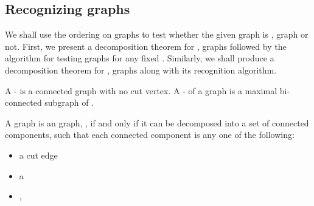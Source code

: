 \documentclass[runningheads]{llncs}
\begin{document}
\subsection{Recognizing  graphs}
We shall use the ordering on  graphs to test whether the given graph is , graph or not. First, we present a decomposition theorem for , graphs followed by the algorithm for testing  graphs for any fixed . Similarly, we shall produce a decomposition theorem for , graphs along with its recognition algorithm.

\begin{definition}
A -  is a connected graph with no cut vertex. A -  of a graph  is a maximal bi-connected subgraph of . 
\end{definition}


\begin{theorem}
\label{decompositionsc2k}
A graph  is an  graph, , if and only if it can be decomposed into a set of connected components, such that each connected component is any one of the following: 
\begin{itemize}
\item a cut edge
\item a 
\item , 
\end{itemize}
\end{theorem}
\end{document}
